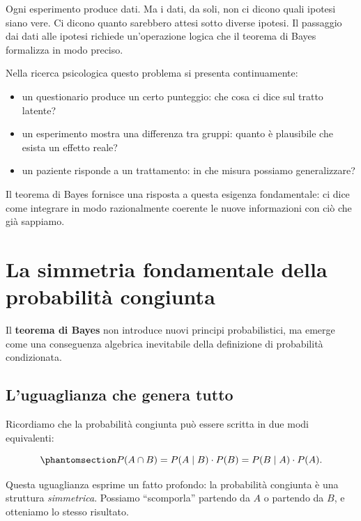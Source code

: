 \documentclass[
  italian,
  letterpaper,
  a4paper,
  11pt,
  open=any]{scrbook}
\providecommand{\tightlist}{%
  \setlength{\itemsep}{0pt}\setlength{\parskip}{0pt}}
\theoremstyle{plain}
\theoremstyle{definition}
\theoremstyle{definition}
\theoremstyle{remark}
\begin{document}
Ogni esperimento produce dati. Ma i dati, da soli, non ci dicono quali
ipotesi siano vere. Ci dicono quanto sarebbero attesi sotto diverse
ipotesi. Il passaggio dai dati alle ipotesi richiede un'operazione
logica che il teorema di Bayes formalizza in modo preciso.

Nella ricerca psicologica questo problema si presenta continuamente:

\begin{itemize}
\tightlist
\item
  un questionario produce un certo punteggio: che cosa ci dice sul
  tratto latente?
\item
  un esperimento mostra una differenza tra gruppi: quanto è plausibile
  che esista un effetto reale?
\item
  un paziente risponde a un trattamento: in che misura possiamo
  generalizzare?
\end{itemize}

Il teorema di Bayes fornisce una risposta a questa esigenza
fondamentale: ci dice come integrare in modo razionalmente coerente le
nuove informazioni con ciò che già sappiamo.

\section{La simmetria fondamentale della probabilità
congiunta}\label{sec-bayes-derivation}

Il \textbf{teorema di Bayes} non introduce nuovi principi
probabilistici, ma emerge come una conseguenza algebrica inevitabile
della definizione di probabilità condizionata.

\subsection{L'uguaglianza che genera
tutto}\label{luguaglianza-che-genera-tutto}

Ricordiamo che la probabilità congiunta può essere scritta in due modi
equivalenti:

\begin{equation}\protect\phantomsection\label{eq-joint-symmetry}{
P(A \cap B) = P(A \mid B) \cdot P(B) = P(B \mid A) \cdot P(A).
}\end{equation}

Questa uguaglianza esprime un fatto profondo: la probabilità congiunta è
una struttura \emph{simmetrica}. Possiamo ``scomporla'' partendo da
\(A\) o partendo da \(B\), e otteniamo lo stesso risultato.
\end{document}
